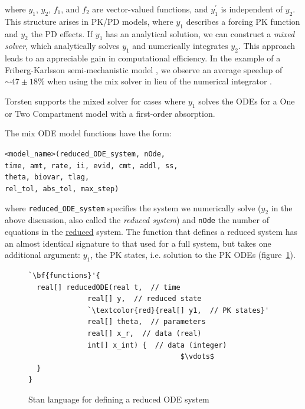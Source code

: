 \documentclass[11pt]{amsart}
\newenvironment{fmpage}[1]
     {\begin{lrbox}{\fmbox}\begin{minipage}{#1}}
     {\end{minipage}\end{lrbox}\fbox{\usebox{\fmbox}}}
\begin{document}
where $y_1$, $y_2$, $f_1$, and $f_2$ are vector-valued functions, and  $y_1^\prime$ is independent of $y_2$. This structure arises in PK/PD models, where $y_1$ describes a forcing PK function and $y_2$ the PD effects. If $y_1$ has an analytical solution, we can construct a \textit{mixed solver}, which analytically solves $y_1$ and numerically integrates $y_2$. This approach leads to an appreciable gain in computational efficiency. In the example of a Friberg-Karlsson semi-mechanistic model \cite{2364}, we observe an average speedup of $\sim 47 \pm 18 \%$ when using the mix solver in lieu of the numerical integrator \cite{mixedSolver}.

Torsten supports the mixed solver for cases where $y_1$ solves the ODEs for a One or Two Compartment model with a first-order absorption.

The mix ODE model functions have the form:

\texttt{<model\_name>(reduced\_ODE\_system, nOde, \\
\phantom{<model\_name>} time, amt, rate, ii, evid, cmt, addl, ss, \\
\phantom{<model\_name>} theta, biovar, tlag, \\                              
\phantom{<model\_name>} rel\_tol, abs\_tol, max\_step)}

where \texttt{reduced\_ODE\_system} specifies the system we  numerically solve ($y_2$ in the above discussion, also called the \textit{reduced system}) and \texttt{nOde} the number of equations in the \underline{reduced} system. The function that defines a reduced system has an almost identical signature to that used for a full system, but takes one additional argument: $y_1$, the PK states, i.e. solution to the PK ODEs (figure~\ref{reducedODESystem}).

\begin{figure}[htbp]
\caption{Stan language for defining a reduced ODE system}
\begin{center}
\begin{small}
\begin{fmpage}{\textwidth - .75in}
\begin{lstlisting}[basicstyle=\footnotesize\ttfamily,mathescape=true,flexiblecolumns=true,frame=single,escapeinside=`']
`\bf{functions}'{
  real[] reducedODE(real t,  // time
			  real[] y,  // reduced state
			  `\textcolor{red}{real[] y1,  // PK states}'
			  real[] theta,  // parameters
			  real[] x_r,  // data (real)
			  int[] x_int) {  // data (integer)	        
                                    $\vdots$			       
  }
}
\end{lstlisting}
\end{fmpage}
\end{small}
\end{center}
\label{reducedODESystem}
\end{figure}
\end{document}
